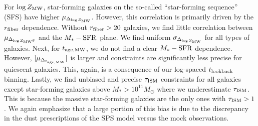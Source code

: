 For $\log Z_{\rm MW}$, star-forming galaxies on the so-called ``star-forming
sequence'' (SFS) have higher $\mu_{\Delta_{\log Z_{\rm MW}}}$.
However, this correlation is primarily driven by the $r_{\rm fiber}$ dependence. 
Without $r_{\rm fiber} > 20$ galaxies, we find little correlation between
$\mu_{\Delta_{\log Z_{\rm MW}\theta}}$ and the $M_*-{\rm SFR}$ plane. 
We find uniform $\sigma_{\Delta_{\log Z_{\rm MW}}}$ for all types of galaxies. 
Next, for $t_{\rm age, MW}$, we do not find a clear $M_*-{\rm SFR}$ dependence. 
However, $|\mu_{\Delta_{t_{\rm age, MW}}}|$ is larger and constraints are significantly
less precise for quiescent galaxies. 
This, again, is a consequence of our log-spaced $t_{\rm lookback}$ binning. 
Lastly, we find unbiased and precise $\tau_{\rm ISM}$ constraints for all galaxies
except star-forming galaxies above $M_* > 10^{11}M_\odot$ where we
underestimate $\tau_{\rm ISM}$. 
This is because the massive star-forming galaxies are the only ones with
$\tau_{\rm ISM} > 1$. 
We again emphasize that a large portion of this bias is due to the discrepancy
in the dust prescriptions of the SPS model versus the mock observations.  
